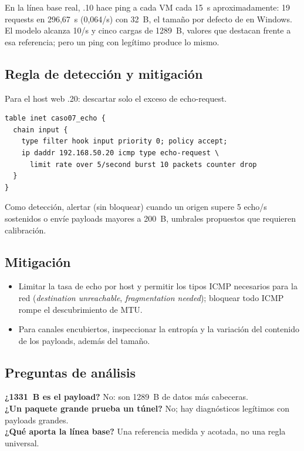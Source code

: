 
En la línea base real, .10 hace ping a cada VM cada 15~s aproximadamente: 19 requests en 296,67~s (0,064/s) con 32~B, el tamaño por defecto de  en Windows. El modelo alcanza 10/s y cinco cargas de 1289~B, valores que destacan frente a esa referencia; pero un ping con  legítimo produce lo mismo.

\subsection{Regla de detección y mitigación}
Para el host web .20: descartar solo el exceso de echo-request.
\begin{lstlisting}
table inet caso07_echo {
  chain input {
    type filter hook input priority 0; policy accept;
    ip daddr 192.168.50.20 icmp type echo-request \
      limit rate over 5/second burst 10 packets counter drop
  }
}
\end{lstlisting}
Como detección, alertar (sin bloquear) cuando un origen supere 5 echo/s sostenidos o envíe payloads mayores a 200~B, umbrales propuestos que requieren calibración.

\subsection{Mitigación}
\begin{itemize}
\item Limitar la tasa de echo por host y permitir los tipos ICMP necesarios para la red (\emph{destination unreachable}, \emph{fragmentation needed}); bloquear todo ICMP rompe el descubrimiento de MTU.
\item Para canales encubiertos, inspeccionar la entropía y la variación del contenido de los payloads, además del tamaño.
\end{itemize}

\subsection{Preguntas de análisis}
\textbf{¿1331~B es el payload?} No: son 1289~B de datos más cabeceras.\\
\textbf{¿Un paquete grande prueba un túnel?} No; hay diagnósticos legítimos con payloads grandes.\\
\textbf{¿Qué aporta la línea base?} Una referencia medida y acotada, no una regla universal.

